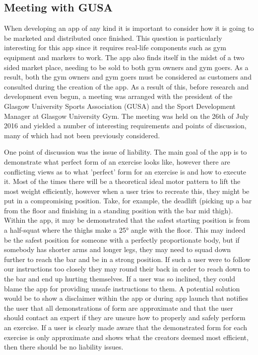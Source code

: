 \documentclass{l4proj}
\begin{document}
\subsection{Meeting with GUSA}
When developing an app of any kind it is important to consider how it is going to be marketed and distributed once finished. This question is particularly interesting for this app since it requires real-life components such as gym equipment and  markers to work. The app also finds itself in the midst of a two sided market place, needing to be sold to both gym owners and gym goers. As a result, both the gym owners and gym goers must be considered as customers and consulted during the creation of the app. As a result of this, before research and development even begun, a meeting was arranged with the president of the Glasgow University Sports Association (GUSA) and the Sport Development Manager at Glasgow University Gym. The meeting was held on the 26th of July 2016 and yielded a number of interesting requirements and points of discussion, many of which had not been previously considered. 

One point of discussion was the issue of liability. The main goal of the app is to demonstrate what perfect form of an exercise looks like, however there are conflicting views as to what 'perfect' form for an exercise is and how to execute it. Most of the times there will be a theoretical ideal motor pattern to lift the most weight efficiently, however when a user tries to recreate this, they might be put in a compromising position. Take, for example, the deadlift (picking up a bar from the floor and finishing in a standing position with the bar mid thigh). Within the app, it may be demonstrated that the safest starting position is from a half-squat where the thighs make a 25° angle with the floor. This may indeed be the safest position for someone with a perfectly proportionate body, but if somebody has shorter arms and longer legs, they may need to squad down further to reach the bar and be in a strong position. If such a user were to follow our instructions too closely they may round their back in order to reach down to the bar and end up hurting themselves. If a user was so inclined, they could blame the app for providing unsafe instructions to them. A potential solution would be to show a disclaimer within the app or during app launch that notifies the user that all demonstrations of form are approximate and that the user should contact an expert if they are unsure how to properly and safely perform an exercise. If a user is clearly made aware that the demonstrated form for each exercise is only approximate and shows what the creators deemed most efficient, then there should be no liability issues. 
\end{document}

